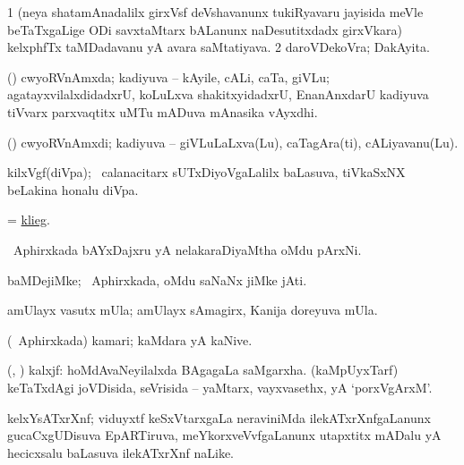 \bentry
{}
\gl{\nA}
\bmng
\bnum
\num{1} (neya shatamAnadalilx girxVsf deVshavanunx tukiRyavaru jayisida meVle beTaTxgaLige ODi savxtaMtarx bALanunx naDesutitxdadx girxVkara) kelxphfTx taMDadavanu yA avara saMtatiyava. 
\num{2} daroVDekoVra; DakAyita. 
\enum
\emng
\eentry

\bentry
{}
\gl{\nA}
\bmng
(\mashA) cwyoRVnAmxda; kadiyuva -- kAyile, cALi, caTa, giVLu; agatayxvilalxdidadxrU, koLuLxva shakitxyidadxrU, EnanAnxdarU kadiyuva tiVvarx parxvaqtitx uMTu mADuva mAnasika vAyxdhi. 
\emng
\eentry

\bentry
{}
\gl{\nA}
\bmng
(\mashA) cwyoRVnAmxdi; kadiyuva -- giVLuLaLxva(Lu), caTagAra(ti), cALiyavanu(Lu). 
\emng
\eentry

\bentry
{}
\gl{\nA}
\bmng
kilxVgf(diVpa); \kanmu\ calanacitarx sUTxDiyoVgaLalilx baLasuva, tiVkaSxNX beLakina honalu diVpa. 
\emng
\eentry

\bentry
{}
\gl{\nA}
\bmng
 = \hyperlink{klieg}{klieg}. 
\emng
\eentry

\bentry
{}
\gl{\nA}
\bmng
\da\ Aphirxkada bAYxDajxru yA nelakaraDiyaMtha oMdu pArxNi. 
\emng
\eentry

\bentry
{}
\gl{\nA}
\bmng
baMDejiMke; \da\ Aphirxkada, oMdu saNaNx jiMke jAti. 
\emng
\eentry

\bentry
{}
\gl{\nA}
\bmng
amUlayx vasutx mUla; amUlayx sAmagirx, Kanija doreyuva mUla. 
\emng
\eentry

\bentry
{}
\gl{\nA}
\bmng
(\da\ Aphirxkada) kamari; kaMdara yA kaNive. 
\emng
\eentry

\bentry
{}
\gl{\nA}
\bmng
(\ame, \ashi) kalxjf: 
\banum
{} hoMdAvaNeyilalxda BAgagaLa saMgarxha. 
 (kaMpUyxTarf) keTaTxdAgi joVDisida, seVrisida -- yaMtarx, vayxvasethx, yA `porxVgArxM'. 
\eanum
\emng
\eentry

\bentry
{}
\gl{\nA}
\bmng
kelxYsATxrXnf; viduyxtf keSxVtarxgaLa neraviniMda ilekATxrXnfgaLanunx gucaCxgUDisuva EpARTiruva, meYkorxveVvfgaLanunx utapxtitx mADalu yA hecicxsalu baLasuva ilekATxrXnf naLike. 
\emng
\eentry

\bentry
{}
\gl{\saMkiSx}
\bmng
{} 
\emng
\eentry

